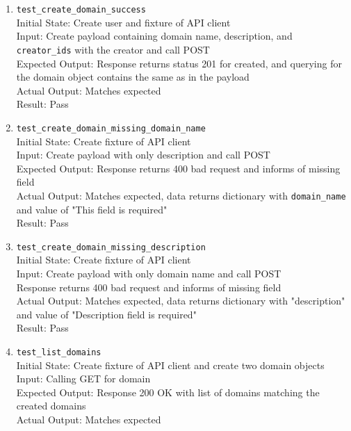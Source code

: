 \documentclass[12pt, titlepage]{article}
\begin{document}
  \begin{enumerate}
    \item \texttt{test\_create\_domain\_success} \label{test-create-domain-success}
      \\Initial State: Create user and fixture of API client
      \\Input: Create payload containing domain name, description, and \texttt{creator\_ids} with the creator and call POST
      \\Expected Output: Response returns status 201 for created, and querying for the domain object contains the same as in the payload
      \\Actual Output: Matches expected
      \\Result: Pass
    \item \texttt{test\_create\_domain\_missing\_domain\_name} \label{test-create-domain-missing-domain-name}
      \\Initial State: Create fixture of API client
      \\Input: Create payload with only description and call POST
      \\Expected Output: Response returns 400 bad request and informs of missing field
      \\Actual Output: Matches expected, data returns dictionary with \texttt{domain\_name} and value of "This field is required"
      \\Result: Pass
    \item \texttt{test\_create\_domain\_missing\_description} \label{test-create-domain-missing-description}
      \\Initial State: Create fixture of API client
      \\Input: Create payload with only domain name and call POST
      \\Response returns 400 bad request and informs of missing field
      \\Actual Output: Matches expected, data returns dictionary with "description" and value of "Description field is required"
      \\Result: Pass
    \item \texttt{test\_list\_domains} \label{test-list-domains}
      \\Initial State: Create fixture of API client and create two domain objects
      \\Input: Calling GET for domain
      \\Expected Output: Response 200 OK with list of domains matching the created domains
      \\Actual Output: Matches expected

\end{enumerate}
\end{document}
